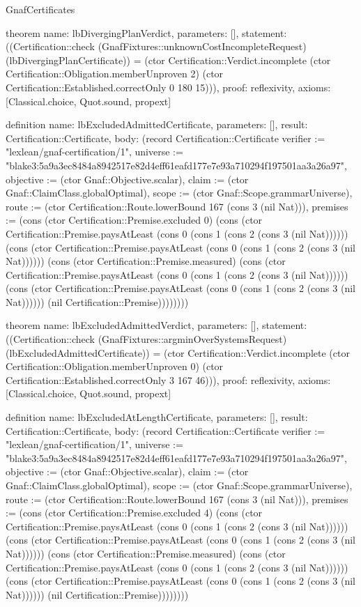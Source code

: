 \begin{lexlean}{GnafCertificates}
\begin{semanticmodule}
theorem{
  name: lbDivergingPlanVerdict,
  parameters: [],
  statement: ((Certification::check (GnafFixtures::unknownCostIncompleteRequest) (lbDivergingPlanCertificate)) = (ctor Certification::Verdict.incomplete (ctor Certification::Obligation.memberUnproven 2) (ctor Certification::Established.correctOnly 0 180 15))),
  proof: reflexivity{},
  axioms: [Classical.choice, Quot.sound, propext]
}

definition{
  name: lbExcludedAdmittedCertificate,
  parameters: [],
  result: Certification::Certificate,
  body: (record Certification::Certificate {verifier := "lexlean/gnaf-certification/1", universe := "blake3:5a9a3ec8484a8942517e82d4eff61eafd177e7e93a710294f197501aa3a26a97", objective := (ctor Gnaf::Objective.scalar), claim := (ctor Gnaf::ClaimClass.globalOptimal), scope := (ctor Gnaf::Scope.grammarUniverse), route := (ctor Certification::Route.lowerBound 167 (cons 3 (nil Nat))), premises := (cons (ctor Certification::Premise.excluded 0) (cons (ctor Certification::Premise.paysAtLeast (cons 0 (cons 1 (cons 2 (cons 3 (nil Nat)))))) (cons (ctor Certification::Premise.paysAtLeast (cons 0 (cons 1 (cons 2 (cons 3 (nil Nat)))))) (cons (ctor Certification::Premise.measured) (cons (ctor Certification::Premise.paysAtLeast (cons 0 (cons 1 (cons 2 (cons 3 (nil Nat)))))) (cons (ctor Certification::Premise.paysAtLeast (cons 0 (cons 1 (cons 2 (cons 3 (nil Nat)))))) (nil Certification::Premise)))))))})
}

theorem{
  name: lbExcludedAdmittedVerdict,
  parameters: [],
  statement: ((Certification::check (GnafFixtures::argminOverSystemsRequest) (lbExcludedAdmittedCertificate)) = (ctor Certification::Verdict.incomplete (ctor Certification::Obligation.memberUnproven 0) (ctor Certification::Established.correctOnly 3 167 46))),
  proof: reflexivity{},
  axioms: [Classical.choice, Quot.sound, propext]
}

definition{
  name: lbExcludedAtLengthCertificate,
  parameters: [],
  result: Certification::Certificate,
  body: (record Certification::Certificate {verifier := "lexlean/gnaf-certification/1", universe := "blake3:5a9a3ec8484a8942517e82d4eff61eafd177e7e93a710294f197501aa3a26a97", objective := (ctor Gnaf::Objective.scalar), claim := (ctor Gnaf::ClaimClass.globalOptimal), scope := (ctor Gnaf::Scope.grammarUniverse), route := (ctor Certification::Route.lowerBound 167 (cons 3 (nil Nat))), premises := (cons (ctor Certification::Premise.excluded 4) (cons (ctor Certification::Premise.paysAtLeast (cons 0 (cons 1 (cons 2 (cons 3 (nil Nat)))))) (cons (ctor Certification::Premise.paysAtLeast (cons 0 (cons 1 (cons 2 (cons 3 (nil Nat)))))) (cons (ctor Certification::Premise.measured) (cons (ctor Certification::Premise.paysAtLeast (cons 0 (cons 1 (cons 2 (cons 3 (nil Nat)))))) (cons (ctor Certification::Premise.paysAtLeast (cons 0 (cons 1 (cons 2 (cons 3 (nil Nat)))))) (nil Certification::Premise)))))))})
}


\end{semanticmodule}
\end{lexlean}
